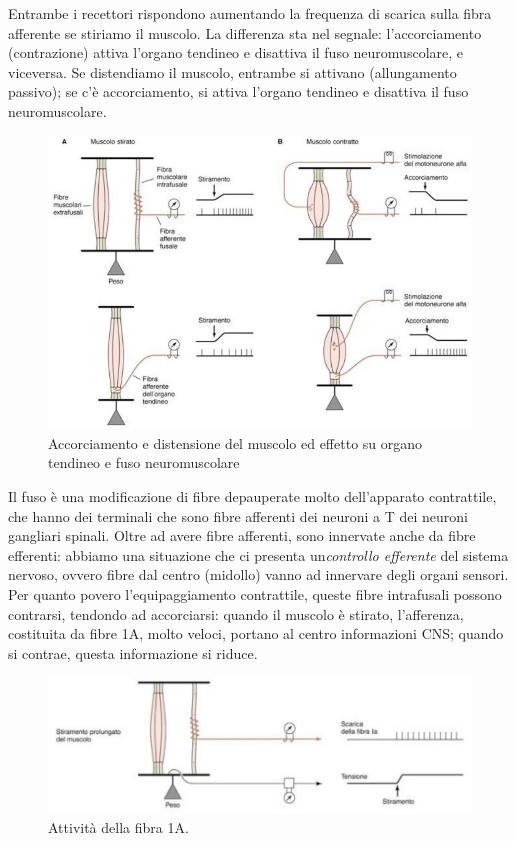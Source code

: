 \documentclass[a4paper,12pt]{article}
\begin{document}
Entrambe i recettori rispondono aumentando la frequenza di scarica sulla fibra afferente se stiriamo il muscolo. La differenza sta nel segnale: l'accorciamento (contrazione) attiva l'organo tendineo e disattiva il fuso neuromuscolare, e viceversa. Se distendiamo il muscolo, entrambe si attivano (allungamento passivo); se c'è accorciamento, si attiva l'organo tendineo e disattiva il fuso neuromuscolare.
\begin{figure}[H]
\centering
\includegraphics[scale=0.4]{immagine/tendineo.jpg}
\caption{Accorciamento e distensione del muscolo ed effetto su organo tendineo e fuso neuromuscolare}
\end{figure}

Il fuso è una modificazione di fibre depauperate molto dell'apparato contrattile, che hanno dei terminali che sono fibre afferenti dei neuroni a T dei neuroni gangliari spinali. Oltre ad avere fibre afferenti, sono innervate anche da fibre efferenti: abbiamo una situazione che ci presenta un\emph{controllo efferente} del sistema nervoso, ovvero fibre dal centro (midollo) vanno ad innervare degli organi sensori. Per quanto povero l'equipaggiamento contrattile, queste fibre intrafusali possono contrarsi, tendondo ad accorciarsi: quando il muscolo è stirato, l'afferenza, costituita da fibre 1A, molto veloci, portano al centro informazioni CNS; quando si contrae, questa informazione si riduce.

\begin{figure}[H]
\centering
\includegraphics[scale=0.4]{immagine/1A.jpg}
\caption{Attività della fibra 1A.}
\end{figure}
\end{document}
